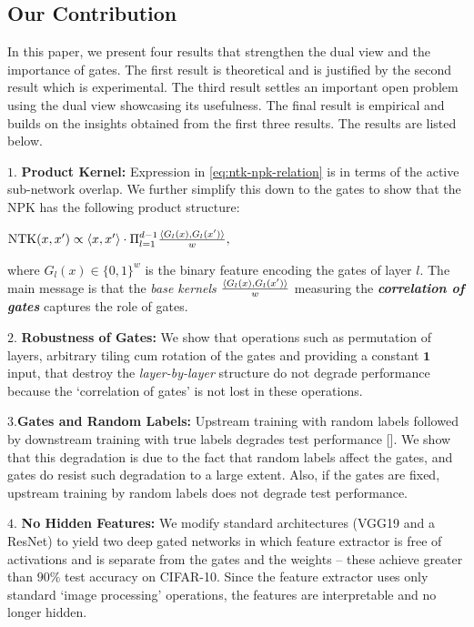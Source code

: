 \subsection{Our Contribution}
In this paper, we present four results that strengthen the dual view and the importance of gates.  The first result is theoretical and is justified by the second result which is experimental. The third result settles an important open problem using the dual view showcasing its usefulness. The final result is empirical and builds on the insights obtained from the first three results. The results are listed below.

\indent\quad$1.$ \textbf{Product Kernel:} Expression in \eqref{eq:ntk-npk-relation} is in terms of the active sub-network overlap. We further simplify this down to the gates to show that the NPK has the following product structure:
\centerline{$\text{NTK}(x,x') \propto \langle x,x'\rangle\cdot \Pi_{l=1}^{d-1} \frac{\langle G_l(x),G_l(x')\rangle}w,$}

where $G_l(x)\in\{0,1\}^w$ is the binary feature encoding the gates of layer $l$. The main message is that the \emph{base kernels} $\frac{\langle G_l(x),G_l(x')\rangle}w$ measuring the \textbf{\emph{correlation of gates} } captures the role of gates.

\indent\quad$2.$ \textbf{Robustness of Gates:} We show that operations such as permutation of layers, arbitrary tiling cum rotation of the gates and providing a constant $\mathbf{1}$ input, that destroy the \emph{layer-by-layer} structure do not degrade performance because the `correlation of gates' is not lost in these operations.

\indent\quad$3.$\textbf{Gates and Random Labels:} Upstream training with random labels followed by downstream training with true labels degrades test performance []. We show that this degradation is due to the fact that random labels affect the gates, and gates do resist such degradation to a large extent. Also, if the gates are fixed, upstream training by random labels does not degrade test performance.

\indent\quad$4.$ \textbf{No Hidden Features:} We modify standard architectures (VGG19 and a ResNet) to yield two deep gated networks in which feature extractor is free of activations and is separate from the gates and the weights -- these achieve greater than $90\%$ test accuracy on CIFAR-10. Since the feature extractor uses only standard `image processing' operations, the features are interpretable and no longer hidden.

